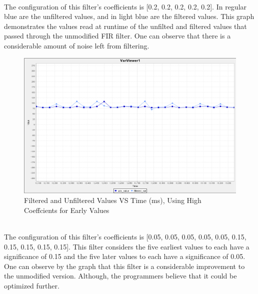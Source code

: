 \documentclass[12pt]{report}
\begin{document}
\\The configuration of this filter's coefficients is [0.2, 0.2, 0.2, 0.2, 0.2]. In regular blue are the unfiltered values, and in light blue are the filtered values. This graph demonstrates the values read at runtime of the unfilted and filtered values that passed through the unmodified FIR filter. One can observe that there is a considerable amount of noise left from filtering.
\begin{figure}[h]
	\label{Linear Graph of the Filtered and Unfiltered Values Plotted Against Time}
	\begin{center}
		\includegraphics[scale=0.5]{./figures/adc_10coeffs_early_high_values.PNG}
		\caption{Filtered and Unfiltered Values VS Time (ms), Using High Coeffcients for Early Values}
	\end{center}
\end{figure}
\\The configuration of this filter's coefficients is [0.05, 0.05, 0.05, 0.05, 0.05, 0.15, 0.15, 0.15, 0.15, 0.15]. This filter considers the five earliest values to each have a significance of 0.15 and the five later values to each have a significance of 0.05. One can observe by the graph that this filter is a considerable improvement to the unmodified version. Although, the programmers believe that it could be optimized further.
\end{document}
